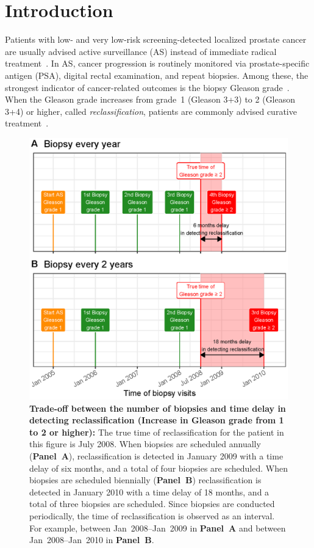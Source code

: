 \section{Introduction}
Patients with low- and very low-risk screening-detected localized prostate cancer are usually advised active surveillance (AS) instead of immediate radical treatment~\citep{briganti2018active}. In AS, cancer progression is routinely monitored via prostate-specific antigen (PSA), digital rectal examination, and repeat biopsies. Among these, the strongest indicator of cancer-related outcomes is the biopsy Gleason grade~\citep{epsteinGG2014}. When the Gleason grade increases from grade~1 (Gleason 3+3) to 2 (Gleason 3+4) or higher, called \textit{reclassification}, patients are commonly advised curative treatment~\citep{bul2013active}.

\begin{figure}
\centerline{\includegraphics[width=\columnwidth]{images/delay_explanation.eps}}
\caption{\textbf{Trade-off between the number of biopsies and time delay in detecting reclassification (Increase in Gleason grade from 1 to 2 or higher):} The true time of reclassification for the patient in this figure is July 2008. When biopsies are scheduled annually (\textbf{Panel~A}), reclassification is detected in January 2009 with a time delay of six months, and a total of four biopsies are scheduled. When biopsies are scheduled biennially (\textbf{Panel~B}) reclassification is detected in January 2010 with a time delay of 18 months, and a total of three biopsies are scheduled. Since biopsies are conducted periodically, the time of reclassification is observed as an interval. For example, between Jan~2008--Jan~2009 in \textbf{Panel~A} and between Jan~2008--Jan~2010 in \textbf{Panel~B}.}
\label{fig:delay_explanation}
\end{figure}

